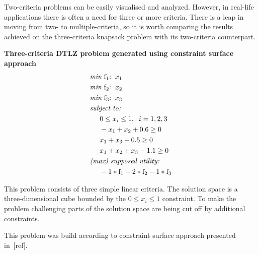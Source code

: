\begin{description}
    Two-criteria problems can be easily visualised and analyzed. However, in
    real-life applications there is often a need for three or more
    criteria. There is a leap in moving from two- to multiple-criteria, so it
    is worth comparing the results achieved on the three-criteria knapsack
    problem with its two-criteria counterpart.

  \item{\textbf{Three-criteria DTLZ problem generated using constraint surface
    approach}}
    \begin{align*}
      & \textit{min}\text{ f$_1$:} \hspace{0.2cm} x_1 \\
      & \textit{min}\text{ f$_2$:} \hspace{0.2cm} x_2 \\
      & \textit{min}\text{ f$_3$:} \hspace{0.2cm} x_3 \\
      & \textit{subject to:} \\
      & \hspace{0.5cm} 0 \le x_i \le 1, \hspace{0.2cm} i = 1, 2, 3 \\
      & \hspace{0.5cm} -x_1 + x_2 + 0.6 \ge 0 \\
      & \hspace{0.5cm} x_1 + x_3 - 0.5 \ge 0 \\
      & \hspace{0.5cm} x_1 + x_2 + x_3 - 1.1 \ge 0 \\
      & \textit{(max) supposed utility:} \\
      & \hspace{0.5cm} -1 * \text{f}_1 - 2 * \text{f}_2 - 1 * \text{f}_3
    \end{align*}

    This problem consists of three simple linear criteria. The solution space
    is a three-dimensional cube bounded by the $0 \le x_i \le 1$ constraint. To
    make the problem challenging parts of the solution space are being cut off
    by additional constraints.

    This problem was build according to constraint surface approach presented
    in~[ref].


\end{description}
